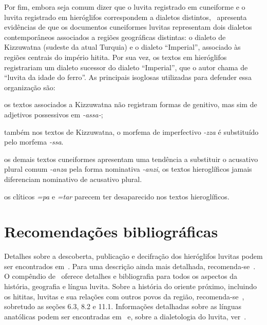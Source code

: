 Por fim, embora seja comum dizer que o luvita registrado em cuneiforme e o
luvita registrado em hieróglifos correspondem a dialetos
distintos,~\citet{Yakubovich2010} apresenta evidências de que os
documentos cuneiformes luvitas representam dois dialetos contemporâneos
associados a regiões geográficas distintas: o dialeto de Kizzuwatna (sudeste da
atual Turquia) e o dialeto ``Imperial'', associado às regiões centrais do
império hitita.
Por sua vez, os textos em hieróglifos registrariam um dialeto sucessor do
dialeto ``Imperial'', que o autor chama de ``luvita da idade do ferro''.
As principais isoglosas utilizadas para defender essa organização são:
\begin{inparaenum}
	\item os textos associados a Kizzuwatna não registram formas de genitivo, mas
	sim de adjetivos possessivos em \emph{-assa-};
	\item também nos textos de Kizzuwatna, o morfema de imperfectivo \emph{-zza}
	é substituído pelo morfema \emph{-ssa}.
	\item os demais textos cuneiformes apresentam uma tendência a substituir o
	acusativo plural comum \emph{-anza} pela forma nominativa \emph{-anzi},
	os textos hieroglíficos jamais diferenciam nominativo de acusativo plural.
	\item os clíticos \emph{=pa} e \emph{=tar} parecem ter desaparecido nos textos
	hieroglíficos.
\end{inparaenum}


\begin{center}
\end{center}

\section{Recomendações bibliográficas}

Detalhes sobre a descoberta, publicação e decifração dos hieróglifos luvitas
podem ser encontrados em~\citet[pp. 131ff.]{HawkinsScripts}. Para uma descrição
ainda mais detalhada, recomenda-se~\citet[pp. 6-17]{CHLI11}.
O compêndio de~\citet{Melchert2003} oferece detalhes e bibliografia para todos
os aspectos da história, geografia e língua luvita.
Sobre a história do oriente próximo, incluindo os hititas, luvitas e sua
relações com outros povos da região, reco\-men\-da-se~\citet{Mieroop2015}, sobretudo
as seções 6.3, 8.2 e 11.1.
Informações detalhadas sobre as línguas anatólicas podem ser encontradas
em~\citet[239--308]{HSK41.1} e, sobre a dialetologia do luvita,
ver~\citet{Yakubovich2010}.
